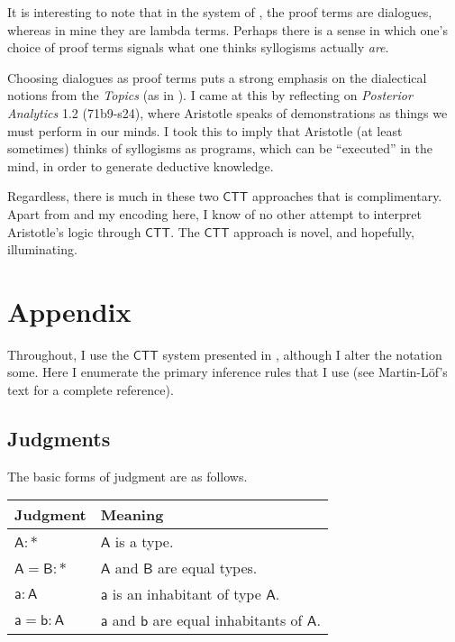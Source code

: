 \documentclass{article}
\newcommand\e{\mathsf}
\def\CTT/{$\e{CTT}$}
\def\Type/{\e{*}}
\def\a/{\e{a}}
\def\b/{\e{b}}
\def\A/{\e{A}}
\def\B/{\e{B}}
\begin{document}
It is interesting to note that in the system of \citet{CrubellierEtAl2019}, the proof terms are dialogues, whereas in mine they are lambda terms. Perhaps there is a sense in which one's choice of proof terms signals what one thinks syllogisms actually \emph{are}.

Choosing dialogues as proof terms puts a strong emphasis on the dialectical notions from the \emph{Topics} (as in \citealt{MarionAndRuckert2016}). I came at this by reflecting on \emph{Posterior Analytics} 1.2 (71b9-s24), where Aristotle speaks of demonstrations as things we must perform in our minds. I took this to imply that Aristotle (at least sometimes) thinks of syllogisms as programs, which can be ``executed'' in the mind, in order to generate deductive knowledge.

Regardless, there is much in these two \CTT/ approaches that is complimentary. Apart from \citet{CrubellierEtAl2019} and my encoding here, I know of no other attempt to interpret Aristotle's logic through \CTT/. The \CTT/ approach is novel, and hopefully, illuminating.


\newpage
\appendix
\section{Appendix}

Throughout, I use the \CTT/ system presented in \citet{MartinLof1984}, although I alter the notation some. Here I enumerate the primary inference rules that I use (see Martin-L\"of's text for a complete reference).


\subsection{Judgments}

The basic forms of judgment are as follows.

\begin{center}
\begin{tabular}{l l}
  Judgment   & Meaning \\
  \hline
  $\A/ : \Type/$  & $\A/$ is a type. \\
  $\A/ = \B/ : \Type/$  & $\A/$ and $\B/$ are equal types. \\
  $\a/ : \A/$ & $\a/$ is an inhabitant of type $\A/$. \\
  $\a/ = \b/ : \A/$ & $\a/$ and $\b/$ are equal inhabitants of $\A/$.
\end{tabular}
\end{center}
\end{document}
